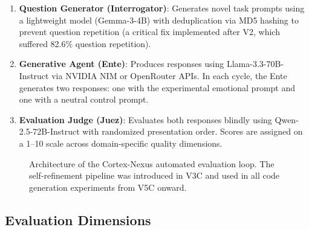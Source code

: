 \documentclass[lineno]{wlpeerj}
\begin{document}
\begin{enumerate}
    \item \textbf{Question Generator (Interrogator)}: Generates novel task prompts using a lightweight model (Gemma-3-4B) with deduplication via MD5 hashing to prevent question repetition (a critical fix implemented after V2, which suffered 82.6\% question repetition).
    \item \textbf{Generative Agent (Ente)}: Produces responses using Llama-3.3-70B-Instruct via NVIDIA NIM or OpenRouter APIs. In each cycle, the Ente generates two responses: one with the experimental emotional prompt and one with a neutral control prompt.
    \item \textbf{Evaluation Judge (Juez)}: Evaluates both responses blindly using Qwen-2.5-72B-Instruct with randomized presentation order. Scores are assigned on a 1--10 scale across domain-specific quality dimensions.
\end{enumerate}

\begin{figure}[ht]
\centering
{}
\caption{Architecture of the Cortex-Nexus automated evaluation loop. The self-refinement pipeline was introduced in V3C and used in all code generation experiments from V5C onward.}
\label{fig:architecture}
\end{figure}

\subsection{Evaluation Dimensions}
\end{document}
